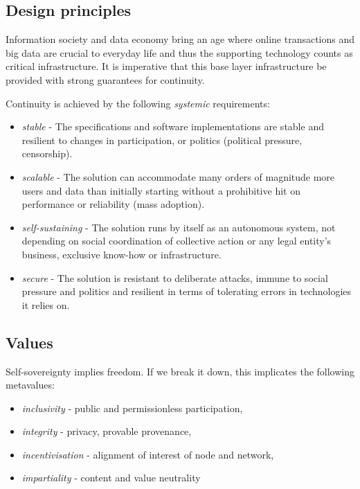 \subsection{Design principles}\label{sec:design-principles}

Information society  and data economy bring an age where online transactions and big data are crucial to everyday life and thus the supporting technology counts as critical infrastructure. It is imperative that this base layer infrastructure be provided with strong guarantees for continuity. 

Continuity is achieved by the following \emph{systemic} requirements:

\begin{itemize}
\item \emph{stable} - The specifications and software implementations are stable and resilient to changes in participation, or politics (political pressure, censorship).
\item \emph{scalable} - The solution can accommodate many orders of magnitude more users and data than initially starting without a prohibitive hit on performance or reliability (mass adoption).
\item \emph{self-sustaining} - The solution runs by itself as an autonomous system, not depending on social coordination of collective action or any legal entity's business, exclusive know-how or infrastructure.   
\item \emph{secure} - The solution is resistant to deliberate attacks, immune to  social pressure  and politics and resilient in terms of tolerating errors in technologies it relies on. 
\end{itemize}



\subsection{Values}\label{sec:values}

Self-sovereignty implies freedom. If we break it down, this implicates the following metavalues: 

\begin{itemize}
\item \emph{inclusivity} - public and permissionless participation,  
\item \emph{integrity} - privacy, provable provenance, 
\item \emph{incentivisation} - alignment of interest of node and network,
\item \emph{impartiality} -  content and value neutrality  
\end{itemize}

